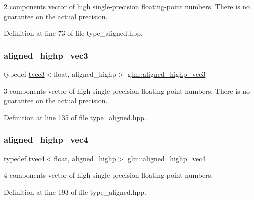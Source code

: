 2 components vector of high single-\/precision floating-\/point numbers. There is no guarantee on the actual precision. 

Definition at line 73 of file type\+\_\+aligned.\+hpp.

\mbox{\label{group__gtc__type__aligned_ga69a63faccd6a139ff97748c81a603d50}} 
\subsubsection{\texorpdfstring{aligned\_highp\_vec3}{aligned\_highp\_vec3}}
{\footnotesize\ttfamily typedef \mbox{\hyperlink{structglm_1_1tvec3}{tvec3}}$<$float, aligned\+\_\+highp$>$ \mbox{\hyperlink{group__gtc__type__aligned_ga69a63faccd6a139ff97748c81a603d50}{glm\+::aligned\+\_\+highp\+\_\+vec3}}}

3 components vector of high single-\/precision floating-\/point numbers. There is no guarantee on the actual precision. 

Definition at line 135 of file type\+\_\+aligned.\+hpp.

\mbox{\label{group__gtc__type__aligned_ga4ec188da13bf0836f9a61b0b2b88425f}} 
\subsubsection{\texorpdfstring{aligned\_highp\_vec4}{aligned\_highp\_vec4}}
{\footnotesize\ttfamily typedef \mbox{\hyperlink{structglm_1_1tvec4}{tvec4}}$<$float, aligned\+\_\+highp$>$ \mbox{\hyperlink{group__gtc__type__aligned_ga4ec188da13bf0836f9a61b0b2b88425f}{glm\+::aligned\+\_\+highp\+\_\+vec4}}}



4 components vector of high single-\/precision floating-\/point numbers. 



Definition at line 193 of file type\+\_\+aligned.\+hpp.

\mbox{\label{group__gtc__type__aligned_gafe9657c41fa58e912f99e92284d79fce}} 

